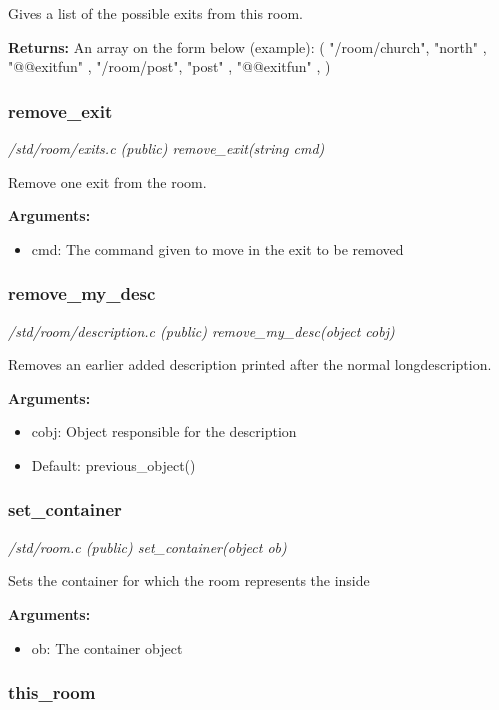 Gives a list of the possible exits from this room.

{\bf Returns:}        An array on the form below (example):
({
"/room/church", "north" , "@@exitfun" ,
"/room/post", "post" , "@@exitfun" ,
})


\subsubsection{remove\_exit}

{\em /std/room/exits.c (public) remove\_exit(string cmd)}

Remove one exit from the room.

{\bf Arguments:}
\begin{itemize}
\item     cmd:   The command given to move in the exit to be removed
\end{itemize}


\subsubsection{remove\_my\_desc}

{\em /std/room/description.c (public) remove\_my\_desc(object cobj)}

Removes an earlier added  description printed after
the normal longdescription.

{\bf Arguments:}
\begin{itemize}
\item       cobj: Object responsible for the description
\item Default: previous\_object()
\end{itemize}


\subsubsection{set\_container}

{\em /std/room.c (public) set\_container(object ob)}

Sets the container for which the room represents the inside

{\bf Arguments:}
\begin{itemize}
\item     ob: The container object
\end{itemize}


\subsubsection{this\_room}

